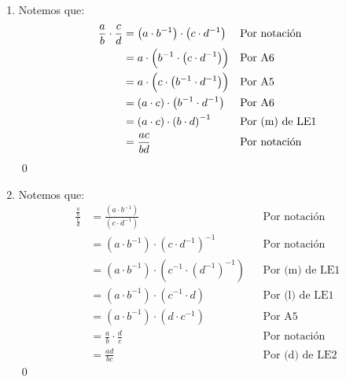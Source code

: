 \documentclass[11pt]{article}
\begin{document}
\begin{enumerate}[label=\alph*)]
\begin{align*}
&=	\left( b^{-1} \cdot d^{-1}  \right) \cdot \left( a \cdot d \pm c \cdot b \right) && \text{Por A9}\\
&=	\left( a \cdot d \pm c \cdot b \right) \cdot  \left( b^{-1} \cdot d^{-1} \right) && \text{Por A5}\\
&=	\left( a \cdot d \pm c \cdot b \right) \cdot  \left( b \cdot d \right)^{-1} && \text{Por (m) de LE1}\\
&=	\left( a \cdot d \pm b \cdot c \right) \cdot \left( b \cdot d \right)^{-1} && \text{Por A5}\\
&=	\frac{ad \pm bc}{bd} && \text{Por notación}
\end{align*}\qed
\item Notemos que:%
\begin{align*}
    \frac{a}{b} \cdot \frac{c}{d} &= \left( a \cdot b^{-1} \right) \cdot \left( c \cdot d^{-1} \right) && \text{Por notación}\\
        &= a \cdot \Bigl( b^{-1} \cdot \left( c \cdot d^{-1} \right) \Bigr) && \text{Por A6}\\
            &= a \cdot \Bigl( c \cdot \left( b^{-1} \cdot d^{-1} \right) \Bigr) && \text{Por A5}\\
	&= \left( a \cdot c \right) \cdot \left( b^{-1} \cdot d^{-1} \right) && \text{Por A6}\\
	&= \left( a \cdot c \right) \cdot \left( b \cdot d \right)^{-1} && \text{Por (m) de LE1}\\
	&= \frac{ac}{bd} && \text{Por notación}
\end{align*}\qed
\item Notemos que:%
\begin{align*}
    \frac{\frac{a}{b}}{\frac{c}{d}} &= \frac{\left( a \cdot b^{-1} \right)}{\left( c \cdot d^{-1} \right)} && \text{Por notación}\\
    &= \left( a \cdot b^{-1} \right) \cdot \left( c \cdot d^{-1} \right)^{-1} && \text{Por notación}\\
    &= \left( a \cdot b^{-1} \right) \cdot \left( c^{-1} \cdot \left( d^{-1} \right) ^{-1} \right) && \text{Por (m) de LE1}\\
    &= \left( a \cdot b^{-1} \right) \cdot \left( c^{-1} \cdot d \right) && \text{Por (l) de LE1}\\
    &= \left( a \cdot b^{-1} \right) \cdot \left( d \cdot c^{-1} \right) && \text{Por A5}\\
    &= \frac{a}{b} \cdot \frac{d}{c} && \text{Por notación}\\
    &= \frac{ad}{bc} && \text{Por (d) de LE2}
\end{align*} \qed
\end{enumerate}
\end{document}
